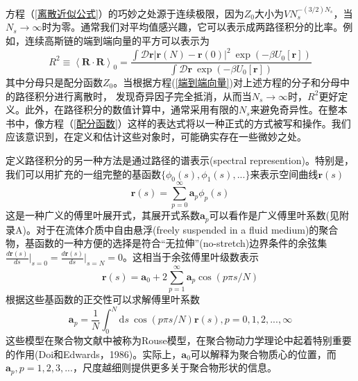 方程（\ref{离散近似公式}）的巧妙之处源于连续极限，因为$Z_0$大小为$VN_s^{−(3/2)N_s}$，当$N_s\rightarrow \infty$时为零。通常我们对平均值感兴趣，它可以表示成两路径积分的比率。例如，连续高斯链的端到端向量的平方可以表示为
\begin{equation}
R^2\equiv \left \langle \mathbf{R}\cdot \mathbf{R}\right \rangle _0=\frac{\int \mathcal{D}\mathbf{r}\left| \mathbf{r}(N)-\mathbf{r}(0) \right|^2~\exp(-\beta U_0[\mathbf{r}])}{\int \mathcal{D}\mathbf{r}~\exp(-\beta U_0[\mathbf{r}])} \label{端到端向量的平方}
\end{equation}
其中分母只是配分函数$Z_0$。当根据方程(\ref{端到端向量})对上述方程的分子和分母中的路径积分进行离散时，
发现奇异因子完全抵消，从而当$N_s\rightarrow \infty$时，$R^2$更好定义。此外，在路径积分的数值计算中，通常采用有限的$N_s$来避免奇异性。在整本书中，像方程（\ref{配分函数}）这样的表达式将以一种正式的方式被写和操作。我们应该意识到，在定义和估计这些对象时，可能确实存在一些微妙之处。

定义路径积分的另一种方法是通过路径的谱表示(spectral represention)。特别是，我们可以用扩充的一组完整的基函数$\lbrace \phi _0(s),\phi _1(s),... \rbrace$来表示空间曲线$\mathbf{r}(s)$
\begin{equation}
\mathbf{r}(s)=\sum_{p=0}^{\infty} \mathbf{a}_p \phi _p(s)
\end{equation}
这是一种广义的傅里叶展开式，其展开式系数$\mathbf{a}_p$可以看作是广义傅里叶系数(见附录A)。对于在流体介质中自由悬浮(freely suspended in a fluid medium)的聚合物，基函数的一种方便的选择是符合“无拉伸”(no-stretch)边界条件的余弦集$\frac{d\mathbf{r}(s)}{ds}\vert _{s=0}=\frac{d\mathbf{r}(s)}{ds}\vert _{s=N}=0$。这相当于余弦傅里叶级数表示
\begin{equation}
\mathbf{r}(s)=\mathbf{a}_0+2\sum_{p=1}^{\infty} \mathbf{a}_p \cos(p\pi s/N)
\end{equation}
根据这些基函数的正交性可以求解傅里叶系数
\begin{equation}
\mathbf{a}_p=\frac{1}{N}\int_{0}^{N}  \mathrm{d}s~\cos(p\pi s/N)\mathbf{r}(s),p=0,1,2,...,\infty
\end{equation}
这些模型在聚合物文献中被称为Rouse模型，在聚合物动力学理论中起着特别重要的作用(Doi和Edwards，1986)。实际上，$\mathbf{a}_0$可以解释为聚合物质心的位置，而$\mathbf{a}_p,p=1,2,3,...$，尺度越细则提供更多关于聚合物形状的信息。

